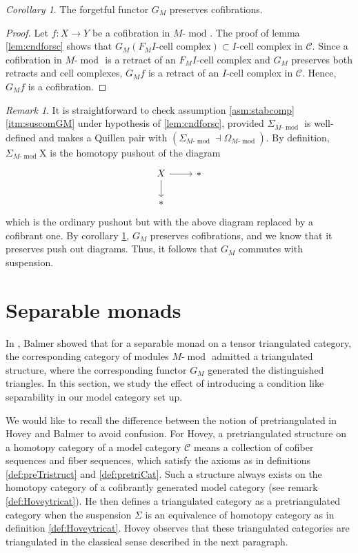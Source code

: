 \documentclass{article}
\newcommand{\cC}{\mathcal{C}}
\newcommand{\module}[2][]{#2\text{-}\modop_{#1}}
\DeclareMathOperator{\modop}{mod}
\theoremstyle{definition}
\theoremstyle{remark}
\newtheorem{remark}[theorem]{Remark}
\newtheorem{corollary}[theorem]{Corollary}
\begin{document}
\begin{corollary} \label{cor:prescofb}
    The forgetful functor $G_{M}$ preserves cofibrations.
\end{corollary}
\begin{proof}
    Let $f:X \rightarrow Y$ be a cofibration in $\module{M}$. The proof of lemma \ref{lem:cndforsc} shows that $G_{M}(F_{M}I\text{-cell complex}) \subset I\text{-cell complex}$ in $\cC$. Since a cofibration in $\module{M}$ is a retract of an $F_{M}I$-cell complex and $G_{M}$ preserves both retracts and
    cell complexes, $G_{M}f$ is a retract of an $I$-cell complex in $\cC$. Hence, $G_M f$ is a cofibration.
\end{proof}
\begin{remark} \label{rem:gmstable}
    It is straightforward to check assumption \ref{asm:stabcomp}\eqref{itm:suscomGM} under hypothesis of \ref{lem:cndforsc}, 
    provided $\Sigma_{\module{M}}$ is well-defined and makes a Quillen pair with $(\Sigma_{\module{M}} \dashv \Omega_{\module{M}})$. 
    By definition, $\Sigma_{\module{M}}$X is the homotopy pushout of the diagram
    \[
    \begin{tikzcd}
      X \arrow{r} \arrow[swap]{d} & *  \\
       * 
    \end{tikzcd}
    \] 
   which is the ordinary pushout but with the above diagram replaced by a cofibrant one. 
   By corollary \ref{cor:prescofb}, $G_{M}$ preserves cofibrations, and we know that it preserves push out diagrams. Thus, it follows that
   $G_M$ commutes with suspension.
\end{remark}





\section{Separable monads} \label{sec:sepmonad}

In \cite{balmer:septrcat}, Balmer showed that for a separable monad on a tensor triangulated category, the corresponding
category of modules $\module{M}$ admitted a triangulated structure, where the corresponding functor $G_M$ generated the
distinguished triangles. In this section, we study the effect of introducing a condition like separability in our model category set up.

We would like to recall the difference between the notion of pretriangulated in Hovey \cite{MR1650134} and Balmer \cite{balmer:septrcat}
to avoid confusion. For Hovey, a pretriangulated structure on a homotopy category of a model category $\cC$ means a collection of 
cofiber sequences and fiber sequences, which satisfy the
axioms as in definitions \ref{def:preTristruct} and \ref{def:pretriCat}. Such a structure always exists on the homotopy category of a 
cofibrantly generated model category (see remark \ref{def:Hoveytricat}). He then defines a triangulated category as a pretriangulated category when 
the suspension $\Sigma$ is an equivalence of homotopy category as in definition \ref{def:Hoveytricat}. Hovey observes that these triangulated categories are triangulated
in the classical sense described in the next paragraph.
\end{document}
